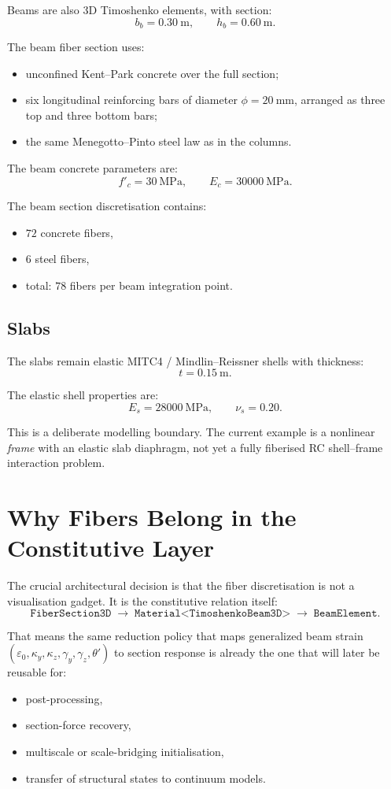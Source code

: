 Beams are also 3D Timoshenko elements, with section:
\[
b_b = 0.30\ \mathrm{m},
\qquad
h_b = 0.60\ \mathrm{m}.
\]

The beam fiber section uses:
\begin{itemize}
  \item unconfined Kent--Park concrete over the full section;
  \item six longitudinal reinforcing bars of diameter
        \(\phi = 20\ \mathrm{mm}\), arranged as three top and three bottom
        bars;
  \item the same Menegotto--Pinto steel law as in the columns.
\end{itemize}

The beam concrete parameters are:
\[
f'_c = 30\ \mathrm{MPa},
\qquad
E_c = 30000\ \mathrm{MPa}.
\]

The beam section discretisation contains:
\begin{itemize}
  \item \(72\) concrete fibers,
  \item \(6\) steel fibers,
  \item total: \(78\) fibers per beam integration point.
\end{itemize}

\subsection{Slabs}

The slabs remain elastic MITC4 / Mindlin--Reissner shells with thickness:
\[
t = 0.15\ \mathrm{m}.
\]

The elastic shell properties are:
\[
E_s = 28000\ \mathrm{MPa},
\qquad
\nu_s = 0.20.
\]

This is a deliberate modelling boundary.  The current example is a nonlinear
\emph{frame} with an elastic slab diaphragm, not yet a fully fiberised RC
shell--frame interaction problem.

\section{Why Fibers Belong in the Constitutive Layer}

The crucial architectural decision is that the fiber discretisation is not a
visualisation gadget.  It is the constitutive relation itself:
\[
\texttt{FiberSection3D}
\;\rightarrow\;
\texttt{Material<TimoshenkoBeam3D>}
\;\rightarrow\;
\texttt{BeamElement}.
\]

That means the same reduction policy that maps generalized beam strain
\((\varepsilon_0,\kappa_y,\kappa_z,\gamma_y,\gamma_z,\theta')\) to section
response is already the one that will later be reusable for:
\begin{itemize}
  \item post-processing,
  \item section-force recovery,
  \item multiscale or scale-bridging initialisation,
  \item transfer of structural states to continuum models.
\end{itemize}

